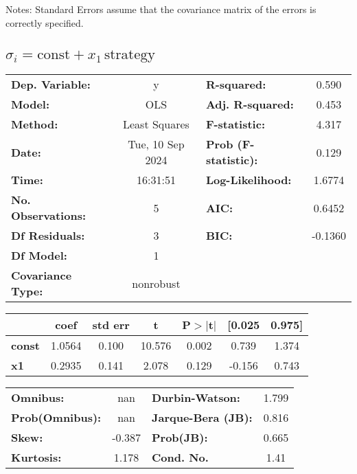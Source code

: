\documentclass{article}
\begin{document}
Notes: \newline
[1] Standard Errors assume that the covariance matrix of the errors is correctly specified.


\subsection{$\sigma_i = \text{const} + x_1\,\text{strategy}$}

\begin{center}
    \begin{tabular}{lclc}
        \toprule
        \textbf{Dep. Variable:}    & y                & \textbf{  R-squared:         } & 0.590   \\
        \textbf{Model:}            & OLS              & \textbf{  Adj. R-squared:    } & 0.453   \\
        \textbf{Method:}           & Least Squares    & \textbf{  F-statistic:       } & 4.317   \\
        \textbf{Date:}             & Tue, 10 Sep 2024 & \textbf{  Prob (F-statistic):} & 0.129   \\
        \textbf{Time:}             & 16:31:51         & \textbf{  Log-Likelihood:    } & 1.6774  \\
        \textbf{No. Observations:} & 5                & \textbf{  AIC:               } & 0.6452  \\
        \textbf{Df Residuals:}     & 3                & \textbf{  BIC:               } & -0.1360 \\
        \textbf{Df Model:}         & 1                & \textbf{                     } &         \\
        \textbf{Covariance Type:}  & nonrobust        & \textbf{                     } &         \\
        \bottomrule
    \end{tabular}
    \begin{tabular}{lcccccc}
                       & \textbf{coef} & \textbf{std err} & \textbf{t} & \textbf{P$> |$t$|$} & \textbf{[0.025} & \textbf{0.975]} \\
        \midrule
        \textbf{const} & 1.0564        & 0.100            & 10.576     & 0.002               & 0.739           & 1.374           \\
        \textbf{x1}    & 0.2935        & 0.141            & 2.078      & 0.129               & -0.156          & 0.743           \\
        \bottomrule
    \end{tabular}
    \begin{tabular}{lclc}
        \textbf{Omnibus:}       & nan    & \textbf{  Durbin-Watson:     } & 1.799 \\
        \textbf{Prob(Omnibus):} & nan    & \textbf{  Jarque-Bera (JB):  } & 0.816 \\
        \textbf{Skew:}          & -0.387 & \textbf{  Prob(JB):          } & 0.665 \\
        \textbf{Kurtosis:}      & 1.178  & \textbf{  Cond. No.          } & 1.41  \\
        \bottomrule
    \end{tabular}
\end{center}
\end{document}
